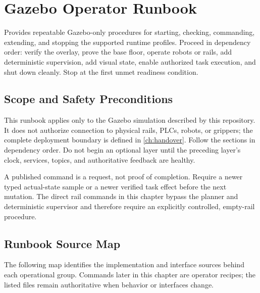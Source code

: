 \chapter{Gazebo Operator Runbook}
\label{ch:operations}

\chapteroverview
  {Provides repeatable Gazebo-only procedures for starting, checking,
   commanding, extending, and stopping the supported runtime profiles.}
  {Proceed in dependency order: verify the overlay, prove the base floor,
   operate robots or rails, add deterministic supervision, add visual state,
   enable authorized task execution, and shut down cleanly. Stop at the first
   unmet readiness condition.}

\section{Scope and Safety Preconditions}

This runbook applies only to the Gazebo simulation described by this repository.
It does not authorize connection to physical rails, PLCs, robots, or grippers;
the complete deployment boundary is defined in \cref{ch:handover}. Follow the
sections in dependency order. Do not begin an optional layer until the preceding
layer's clock, services, topics, and authoritative feedback are healthy.

\begin{safetybox}
A published command is a request, not proof of completion. Require a newer typed
actual-state sample or a newer verified task effect before the next mutation.
The direct rail commands in this chapter bypass the planner and deterministic
supervisor and therefore require an explicitly controlled, empty-rail procedure.
\end{safetybox}

\section{Runbook Source Map}

The following map identifies the implementation and interface sources behind
each operational group.  Commands later in this chapter are operator recipes;
the listed files remain authoritative when behavior or interfaces change.

